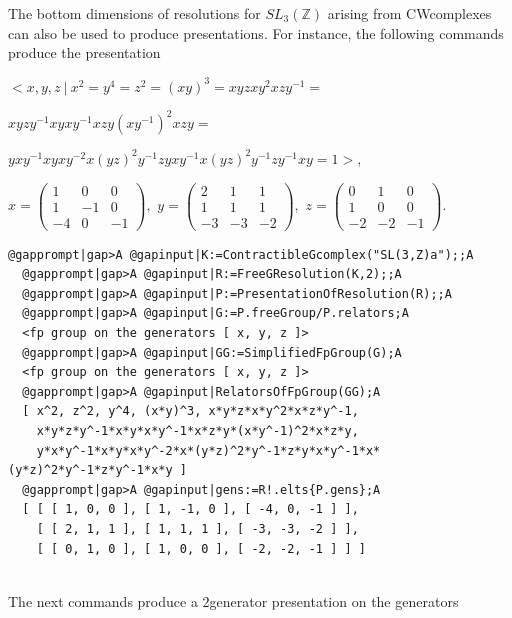 \documentclass[a4paper,11pt]{report}
\begin{document}
{{The bottom dimensions of resolutions for $SL_3(\mathbb Z)$ arising from CW\texttt{}complexes can also be used to produce
presentations. For instance, the following commands produce the presentation 

 $ < x,y,z\ |\ x^2=y^4=z^2=(xy)^3=xyzxy^2xzy^{-1} =$ 

$ xyzy^{-1}xyxy^{-1}xzy(xy^{-1})^2xzy =$ 

$ yxy^{-1}xyxy^{-2}x(yz)^2y^{-1}zyxy^{-1}x(yz)^2y^{-1}zy^{-1}xy = 1 >$, 

$x=\left(\begin{array}{rrr} 1 & 0 & 0\\ 1 & -1 & 0\\ -4 & 0 &-1
\end{array}\right),$ $y=\left(\begin{array}{rrr} 2 & 1 & 1\\ 1 & 1 & 1\\ -3 & -3 &-2
\end{array}\right),$ $z=\left(\begin{array}{rrr} 0 & 1 & 0\\ 1 & 0 & 0\\ -2 & -2 &-1
\end{array}\right). $ 
\begin{Verbatim}[commandchars=@|A,fontsize=\small,frame=single,label=Example]
  @gapprompt|gap>A @gapinput|K:=ContractibleGcomplex("SL(3,Z)a");;A
  @gapprompt|gap>A @gapinput|R:=FreeGResolution(K,2);;A
  @gapprompt|gap>A @gapinput|P:=PresentationOfResolution(R);;A
  @gapprompt|gap>A @gapinput|G:=P.freeGroup/P.relators;A
  <fp group on the generators [ x, y, z ]>
  @gapprompt|gap>A @gapinput|GG:=SimplifiedFpGroup(G);A
  <fp group on the generators [ x, y, z ]>
  @gapprompt|gap>A @gapinput|RelatorsOfFpGroup(GG);A
  [ x^2, z^2, y^4, (x*y)^3, x*y*z*x*y^2*x*z*y^-1, 
    x*y*z*y^-1*x*y*x*y^-1*x*z*y*(x*y^-1)^2*x*z*y, 
    y*x*y^-1*x*y*x*y^-2*x*(y*z)^2*y^-1*z*y*x*y^-1*x*(y*z)^2*y^-1*z*y^-1*x*y ]
  @gapprompt|gap>A @gapinput|gens:=R!.elts{P.gens};A
  [ [ [ 1, 0, 0 ], [ 1, -1, 0 ], [ -4, 0, -1 ] ], 
    [ [ 2, 1, 1 ], [ 1, 1, 1 ], [ -3, -3, -2 ] ], 
    [ [ 0, 1, 0 ], [ 1, 0, 0 ], [ -2, -2, -1 ] ] ]
  
\end{Verbatim}
 

The next commands produce a $2$\texttt{}generator presentation on the generators 

}}
\end{document}
